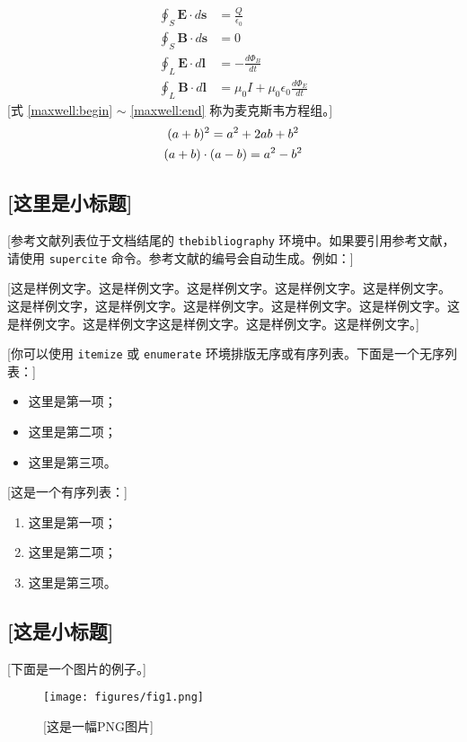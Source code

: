 \documentclass[a4paper,11pt,onecolumn,twoside]{article}
\newcommand{\supercite}[1]{\textsuperscript{\cite{#1}}}
\begin{document}
  \begin{align}
    \oint_S \mathbf{E} \cdot d \mathbf{s} &= \frac{Q}{\epsilon_0}
                                              \label{maxwell:begin} \\
    \oint_S \mathbf{B} \cdot d \mathbf{s} &= 0 \\
    \oint_L \mathbf{E} \cdot d \mathbf{l} &= -\frac{d\Phi_B}{dt} \\
    \oint_L \mathbf{B} \cdot d \mathbf{l} &= \mu_0 I +
               \mu_0 \epsilon_0 \frac{d\Phi_E}{dt} \label{maxwell:end}
  \end{align}
  [式 \ref{maxwell:begin} $\sim$ \ref{maxwell:end} 称为麦克斯韦方程组。]
  \begin{gather}
    (a + b)^2 = a^2 + 2ab + b^2      \notag   \\
    (a + b) \cdot (a - b) = a^2 - b^2
  \end{gather}


\subsection{[这里是小标题]}
[参考文献列表位于文档结尾的 \texttt{thebibliography} 环境中。如果要引用参考文献，请使用 \texttt{supercite} 命令。参考文献的编号会自动生成。例如：]

[这是样例文字。这是样例文字。这是样例文字\supercite{chendh, whiteside}。这是样例文字。这是样例文字。这是样例文字，\supercite{calms}这是样例文字。这是样例文字。这是样例文字。这是样例文字。这是样例文字。这是样例文字这是样例文字。这是样例文字。这是样例文字\supercite{obrien}。]

[你可以使用 \texttt{itemize} 或 \texttt{enumerate} 环境排版无序或有序列表。下面是一个无序列表：]
\begin{itemize}
    \item 这里是第一项；
    \item 这里是第二项；
    \item 这里是第三项。
\end{itemize}

[这是一个有序列表：]
\begin{enumerate}
    \item 这里是第一项；
    \item 这里是第二项；
    \item 这里是第三项。
\end{enumerate}

\subsection{[这是小标题]}
 [下面是一个图片的例子。]
\begin{figure}[htbp]
  \centering
  \texttt{[image: figures/fig1.png]}
  \caption{[这是一幅PNG图片]} \label{pngsample}
\end{figure}
\end{document}
